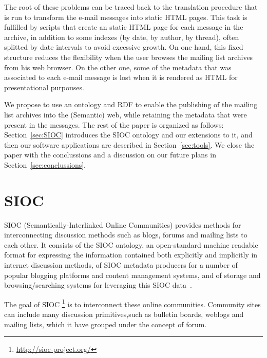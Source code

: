 \documentclass{llncs}
\begin{document}
The root of these problems can be traced back to the translation
procedure that is run to transform the e-mail messages into static
HTML pages. This task is fulfilled by scripts that create an
static HTML page for each message in the archive, in addition to
some indexes (by date, by author, by thread), often splitted by
date intervals to avoid excessive growth. On one hand, this fixed
structure reduces the flexibility when the user browses the
mailing list archives from his web browser. On the other one, some of
the metadata that was associated to each e-mail message is lost
when it is rendered as HTML for presentational purpouses.

We propose to use an ontology and RDF to enable the publishing of
the mailing list archives into the (Semantic) web, while retaining
the metadata that were present in the messages. The rest of the
paper is organized as follows: Section~\ref{sec:SIOC} introduces the
SIOC ontology and our extensions to it, and then our software
applications are described in Section~\ref{sec:tools}. We close
the paper with the conclussions and a discussion on our future plans
in Section~\ref{sec:conclussions}.

\section{\label{sec:SIOC}SIOC}

SIOC (Semantically-Interlinked Online Communities) provides methods for 
interconnecting discussion methods such as blogs, forums and mailing lists 
to each other. It consists of the SIOC ontology, an open-standard machine 
readable format for expressing the information contained both explicitly 
and implicitly in internet discussion methods, of SIOC metadata producers 
for a number of popular blogging platforms and content management systems, 
and of storage and browsing/searching systems for leveraging this SIOC 
data~\cite{Breslin2005}.

The goal of SIOC \footnote{\url{http://sioc-project.org/}} is to interconnect
these online communities. Community sites can include many discussion 
primitives,such as bulletin boards, weblogs and mailing lists, which it 
have grouped under the concept of forum.

\end{document}
